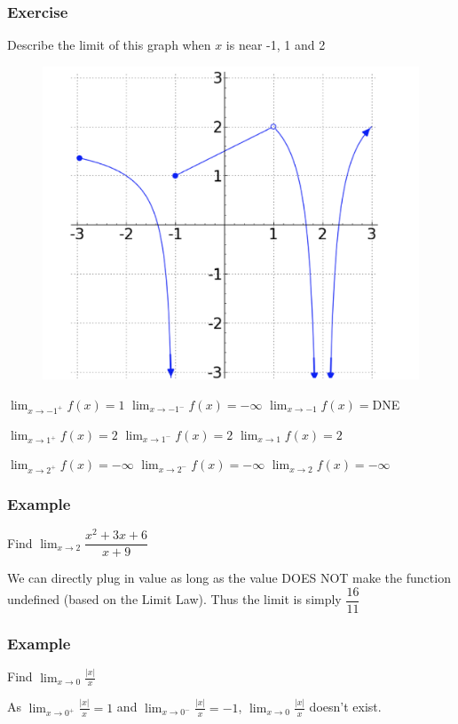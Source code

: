 \documentclass[t]{beamer}
\theoremstyle{plain}
\theoremstyle{definition}
\newcommand{\disp}{\displaystyle}
\newcommand{\limm}[1]{\displaystyle \lim_{x\to #1}}
\begin{document}
\frame
{
\footnotesize

	\frametitle{Exercise}
	Describe the limit of this graph when $x$ is near -1, 1 and 2
	
	\begin{figure}[l]
	\includegraphics[scale=.28]{fig/limit2}
	\label{fig}
	\end{figure}	
	
	\pause
	
    $\limm{-1^+}f(x)=1$ \hspace{2em}
	$\limm{-1^-}f(x)=-\infty$  \hspace{2em}
	$\limm{-1}f(x)=$DNE
	
	$\limm{1^+}f(x)=2$ \hspace{3em}
	$\limm{1^-}f(x)=2$  \hspace{2.7em}
	$\limm{1}f(x)=2$
	
	$\limm{2^+}f(x)=-\infty$ \hspace{1.8em}
	$\limm{2^-}f(x)=-\infty$  \hspace{1.6em}
	$\limm{2}f(x)=-\infty$
}


\frame
{
	\frametitle{Example}
	Find $\limm{2}\dfrac{x^2 + 3x + 6}{x + 9}$
	
	\vspace{3em}

	We can directly plug in value as long as the value DOES NOT make the function undefined (based on the Limit Law).  Thus the limit is simply $\dfrac{16}{11}$
}

\frame
{
	\frametitle{Example}
	Find $\disp{\lim_{x\to 0}} \disp{\frac{|x|}{x}}$
	
	\vspace{3em}

	As $\disp{\lim_{x\to 0^+}  \frac{|x|}{x}} =1$ and $\disp{\lim_{x\to 0^-}  \frac{|x|}{x}} =-1$,
	$\disp{\lim_{x\to 0}  \frac{|x|}{x}}$ doesn't exist.

}
\end{document}
